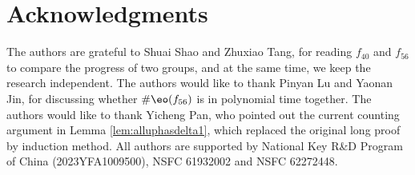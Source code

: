 \section{Acknowledgments}

The authors are grateful to  Shuai Shao and Zhuxiao Tang, for reading $f_{40}$ and $f_{56}$ to compare the progress of two groups, and at the same time, we keep the research independent. 
The authors would like to thank Pinyan Lu and Yaonan Jin, for discussing whether $\#\eo(f_{56})$ is in polynomial time together. 
The authors would like to thank Yicheng Pan, who pointed out the current counting argument in Lemma \ref{lem:alluphasdelta1}, which replaced the original long proof by induction method. 
All authors are supported by National Key R\&D Program of China (2023YFA1009500), NSFC 61932002 and NSFC 62272448. 


